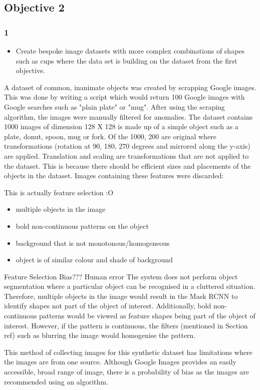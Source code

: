 \subsection{Objective 2}
\subsubsection{1}
\begin{itemize}
	\item Create bespoke image datasets with more complex combinations of shapes such as cups where the data set is building on the dataset from the first objective.
\end{itemize}
A dataset of common, inanimate objects was created by scrapping Google images. This was done by writing a script which would return 100 Google images with Google searches such as "plain plate" or "mug". After using the scraping algorithm, the images were manually filtered for anomalies. The dataset contains 1000 images of dimension  128 X 128 is made up of a simple object such as a plate, donut, spoon, mug or fork. Of the 1000, 200 are original where transformations (rotation at 90, 180, 270 degrees and mirrored along the y-axis) are applied. Translation and scaling are transformations that are not applied to the dataset. This is because there should be efficient sizes and placements of the objects in the dataset. Images containing these features were discarded:

This is actually feature selection :O
\begin{itemize}
\item multiple objects in the image
\item bold non-continuous patterns on the object
\item background that is not monotonous/homogeneous
\item object is of similar colour and shade of background
\end{itemize}
Feature Selection Bias??? Human error
The system does not perform object segmentation where a particular object can be recognised in a cluttered situation. Therefore, multiple objects in the image would result in the Mask RCNN to identify shapes not part of the object of interest. Additionally, bold non-continuous patterns would be viewed as feature shapes being part of the object of interest. However, if the pattern is continuous, the filters (mentioned in Section ref) such as blurring the image would homogenise the pattern. 

This method of collecting images for this synthetic dataset has limitations where the images are from one source. Although Google Images provides an easily accessible, broad range of image, there is a probability of bias as the images are recommended using an algorithm. 


